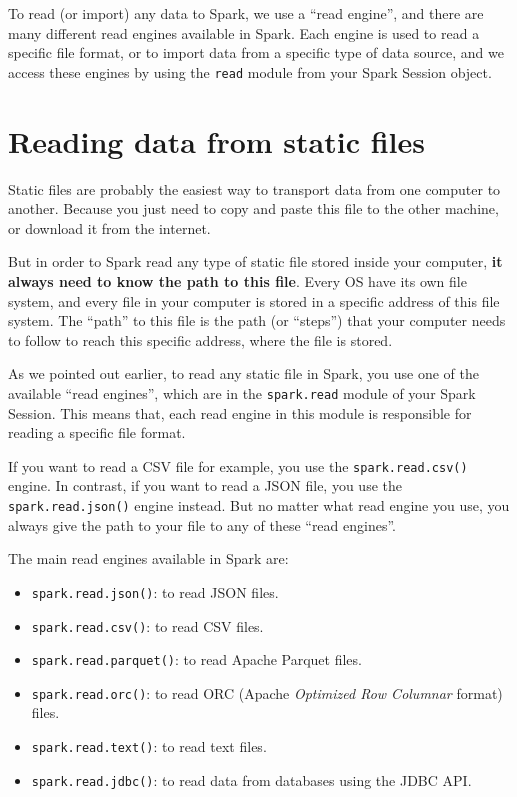 \documentclass[
  11pt,
  letterpaper,
  DIV=11,
  numbers=noendperiod]{scrreprt}
\providecommand{\tightlist}{%
  \setlength{\itemsep}{0pt}\setlength{\parskip}{0pt}}\usepackage{longtable,booktabs,array}
\begin{document}
To read (or import) any data to Spark, we use a ``read engine'', and
there are many different read engines available in Spark. Each engine is
used to read a specific file format, or to import data from a specific
type of data source, and we access these engines by using the
\texttt{read} module from your Spark Session object.

\section{Reading data from static files}\label{sec-read-files}

Static files are probably the easiest way to transport data from one
computer to another. Because you just need to copy and paste this file
to the other machine, or download it from the internet.

But in order to Spark read any type of static file stored inside your
computer, \textbf{it always need to know the path to this file}. Every
OS have its own file system, and every file in your computer is stored
in a specific address of this file system. The ``path'' to this file is
the path (or ``steps'') that your computer needs to follow to reach this
specific address, where the file is stored.

As we pointed out earlier, to read any static file in Spark, you use one
of the available ``read engines'', which are in the \texttt{spark.read}
module of your Spark Session. This means that, each read engine in this
module is responsible for reading a specific file format.

If you want to read a CSV file for example, you use the
\texttt{spark.read.csv()} engine. In contrast, if you want to read a
JSON file, you use the \texttt{spark.read.json()} engine instead. But no
matter what read engine you use, you always give the path to your file
to any of these ``read engines''.

The main read engines available in Spark are:

\begin{itemize}
\tightlist
\item
  \texttt{spark.read.json()}: to read JSON files.
\item
  \texttt{spark.read.csv()}: to read CSV files.
\item
  \texttt{spark.read.parquet()}: to read Apache Parquet files.
\item
  \texttt{spark.read.orc()}: to read ORC (Apache \emph{Optimized Row
  Columnar} format) files.
\item
  \texttt{spark.read.text()}: to read text files.
\item
  \texttt{spark.read.jdbc()}: to read data from databases using the JDBC
  API.
\end{itemize}
\end{document}
